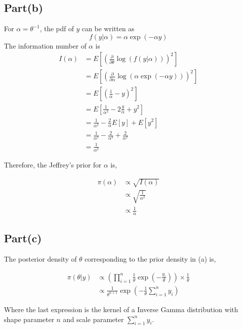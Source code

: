 \documentclass[a4paper]{article}
\begin{document}
\subsection*{Part(b)}
For \(\alpha = \theta^{-1}\), the pdf of \(y\) can be written as 
\[
    f(y|\alpha) = \alpha \exp(-\alpha y)
\]
The information number of \(\alpha\) is 
\begin{align*}
    I(\alpha) &= E \left[\left(\frac{\partial}{\partial \theta } \log(f(y|\alpha))\right)^2\right]\\
    &= E \left[\left(\frac{\partial}{\partial \alpha } \log\left(\alpha\exp\left(-\alpha y\right)\right)\right)^2\right]\\
    &= E \left[\left(\frac{1}{\alpha} -y \right)^2\right]\\
    &= E \left[\frac{1}{\alpha^2} -2 \frac{y}{\alpha} + y^2\right]\\
    &= \frac{1}{\alpha^2} - \frac{2}{\alpha} E[y] + E[y^2]\\
    &= \frac{1}{\alpha^2} - \frac{2}{\alpha^2} + \frac{2}{\alpha^2}\\
    &= \frac{1}{\alpha^2}
\end{align*}

Therefore, the Jeffrey's prior for \(\alpha\) is,

\begin{align*}
    \pi(\alpha) &\propto \sqrt{I(\alpha)}\\
    &\propto \sqrt{\frac{1}{\alpha^2}}\\
    &\propto \frac{1}{\alpha}
\end{align*}

\subsection*{Part(c)}

The posterior density of \(\theta\) corresponding to the prior density in (a) is,

\begin{align*}
    \pi(\theta|y) &\propto \left(\prod_{i=1}^{n}\frac{1}{\theta}\exp\left(-\frac{y_i}{\theta}\right)\right) \times \frac{1}{\theta}\\
    &\propto \frac{1}{\theta^{n+1}}\exp\left(-\frac{1}{\theta}\sum_{i=1}^{n}y_i\right)
\end{align*}

Where the last expression is the kernel of a Inverse Gamma distribution with shape parameter \(n\) and scale parameter \(\sum_{i=1}^{n}y_i\).
\end{document}

